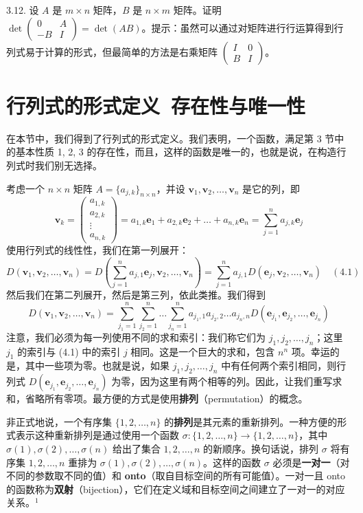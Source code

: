 3.12. 设 $A$ 是 $m \times n$ 矩阵，$B$ 是 $n \times m$ 矩阵。证明 $\det \begin{pmatrix} 0 & A \\ -B & I \end{pmatrix} = \det(AB)$。提示：虽然可以通过对矩阵进行行运算得到行列式易于计算的形式，但最简单的方法是右乘矩阵 $\begin{pmatrix} I & 0 \\ B & I \end{pmatrix}$。


\section{行列式的形式定义~存在性与唯一性}

在本节中，我们得到了行列式的形式定义。我们表明，一个函数，满足第 3 节中的基本性质 1, 2, 3 的存在性，而且，这样的函数是唯一的，也就是说，在构造行列式时我们别无选择。

考虑一个 $n \times n$ 矩阵 $A = \{a_{j,k}\}_{n \times n}$，并设 $\mathbf{v}_1, \mathbf{v}_2, \dots, \mathbf{v}_n$ 是它的列，即
$$
\mathbf{v}_k = \begin{pmatrix} a_{1,k} \\ a_{2,k} \\ \vdots \\ a_{n,k} \end{pmatrix} = a_{1,k} \mathbf{e}_1 + a_{2,k} \mathbf{e}_2 + \dots + a_{n,k} \mathbf{e}_n = \sum_{j=1}^n a_{j,k} \mathbf{e}_j
$$
使用行列式的线性性，我们在第一列展开：
$$
D(\mathbf{v}_1, \mathbf{v}_2, \dots, \mathbf{v}_n) = D(\sum_{j=1}^n a_{j,1} \mathbf{e}_j, \mathbf{v}_2, \dots, \mathbf{v}_n) = \sum_{j=1}^n a_{j,1} D(\mathbf{e}_j, \mathbf{v}_2, \dots, \mathbf{v}_n) \quad (4.1)
$$
然后我们在第二列展开，然后是第三列，依此类推。我们得到
$$
D(\mathbf{v}_1, \mathbf{v}_2, \dots, \mathbf{v}_n) = \sum_{j_1=1}^n \sum_{j_2=1}^n \dots \sum_{j_n=1}^n a_{j_1,1} a_{j_2,2} \dots a_{j_n,n} D(\mathbf{e}_{j_1}, \mathbf{e}_{j_2}, \dots, \mathbf{e}_{j_n})
$$
注意，我们必须为每一列使用不同的求和索引：我们称它们为 $j_1, j_2, \dots, j_n$；这里 $j_1$ 的索引与 (4.1) 中的索引 $j$ 相同。这是一个巨大的求和，包含 $n^n$ 项。幸运的是，其中一些项为零。也就是说，如果 $j_1, j_2, \dots, j_n$ 中有任何两个索引相同，则行列式 $D(\mathbf{e}_{j_1}, \mathbf{e}_{j_2}, \dots, \mathbf{e}_{j_n})$ 为零，因为这里有两个相等的列。因此，让我们重写求和，省略所有零项。最方便的方式是使用\textbf{排列}（permutation）的概念。

非正式地说，一个有序集 $\{1, 2, \dots, n\}$ 的\textbf{排列}是其元素的重新排列。一种方便的形式表示这种重新排列是通过使用一个函数 $\sigma: \{1, 2, \dots, n\} \to \{1, 2, \dots, n\}$，其中 $\sigma(1), \sigma(2), \dots, \sigma(n)$ 给出了集合 $1, 2, \dots, n$ 的新顺序。换句话说，排列 $\sigma$ 将有序集 $1, 2, \dots, n$ 重排为 $\sigma(1), \sigma(2), \dots, \sigma(n)$。这样的函数 $\sigma$ 必须是\textbf{一对一}（对不同的参数取不同的值）和\textbf{ onto}（取自目标空间的所有可能值）。一对一且 onto 的函数称为\textbf{双射}（bijection），它们在定义域和目标空间之间建立了一对一的对应关系。$^1$

